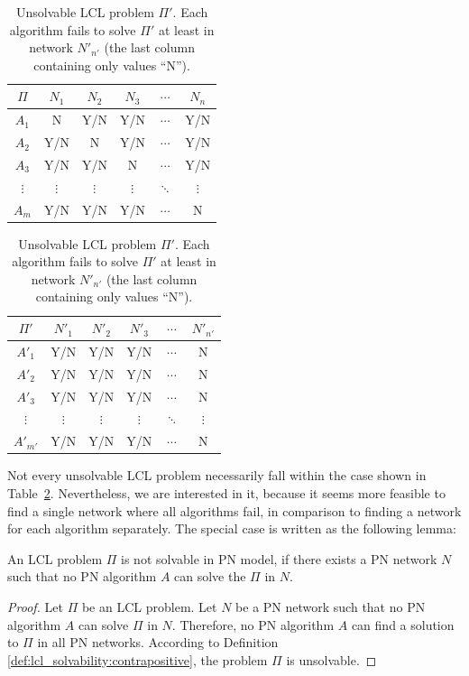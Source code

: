 \begin{table}[H]
    \parbox{.45\linewidth}{
    \centering
        \begin{tabular}{c|ccccc}
        $\Pi$&$N_1$&$N_2$&$N_3$&$\cdots$&$N_n$ \\
        \hline
        $A_1$& N & Y/N & Y/N & $\cdots$ &  Y/N  \\
        $A_2$& Y/N & N & Y/N & $\cdots$ &  Y/N  \\
        $A_3$& Y/N & Y/N & N& $\cdots$ &  Y/N  \\
        $\vdots$&$\vdots$&$\vdots$&$\vdots$&$\ddots$&$\vdots$ \\
        $A_{m}$& Y/N & Y/N & Y/N & $\cdots$ &  N \\
        \hline
        \end{tabular}
    \caption{
        Unsolvable LCL problem $\Pi$.
        Each algorithm fails to solve $\Pi$ in at least some network, denoted by ``N'' (No).
    }
    \label{tbl:unsolvable_lcl:1}
    }
    \hfill
    \parbox{.45\linewidth}{
        \centering
        \begin{tabular}{c|ccccc}
        $\Pi'$&$N'_1$&$N'_2$&$N'_3$&$\cdots$&$N'_{n'}$ \\
        \hline
        $A'_1$& Y/N & Y/N & Y/N & $\cdots$ &  N \\
        $A'_2$& Y/N & Y/N & Y/N & $\cdots$ &  N \\
        $A'_3$& Y/N & Y/N & Y/N & $\cdots$ &  N \\
        $\vdots$&$\vdots$&$\vdots$&$\vdots$&$\ddots$&$\vdots$ \\
        $A'_{m'}$& Y/N & Y/N & Y/N & $\cdots$ &  N \\
        \hline
        \end{tabular}
    \caption{
        Unsolvable LCL problem $\Pi'$.
        Each algorithm fails to solve $\Pi'$ at least in network $N'_{n'}$ (the last column containing only values ``N'').
    }
    \label{tbl:unsolvable_lcl:2}
    }
\end{table}

Not every unsolvable LCL problem necessarily fall within the case shown in Table~\ref{tbl:unsolvable_lcl:2}.
Nevertheless, we are interested in it, because it seems more feasible to find a single network where all algorithms fail, in comparison to finding a network for each algorithm separately.
The special case is written as the following lemma:

\begin{lemma} \label{lem:lcl_unsolvability}
    An LCL problem $\Pi$ is not solvable in PN model, if there exists a PN network $N$ such that no PN algorithm $A$ can solve the $\Pi$ in $N$.
\end{lemma}
\begin{proof}
    Let $\Pi$ be an LCL problem.
    Let $N$ be a PN network such that no PN algorithm $A$ can solve $\Pi$ in $N$.
    Therefore, no PN algorithm $A$ can find a solution to $\Pi$ in all PN networks.
    According to Definition \ref{def:lcl_solvability:contrapositive}, the problem $\Pi$ is unsolvable.
\end{proof}

